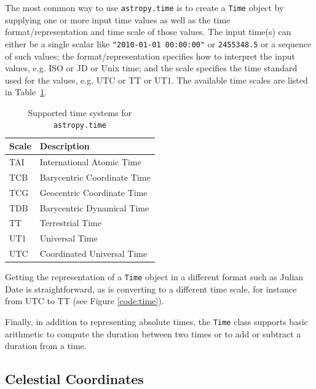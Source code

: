 \documentclass[traditabstract]{aa}
\begin{document}
The most common way to use \texttt{astropy.time} is to create a \texttt{Time} object
by supplying one or more input time values as well as the time format/representation
and time scale of those values. The input time(s) can either be a
single scalar like \verb|"2010-01-01 00:00:00"| or \verb|2455348.5| or a
sequence of such values; the format/representation specifies how to interpret the input
values, e.g. ISO or JD or Unix time; and the scale specifies the time standard
used for the values, e.g. UTC or TT or UT1. The available time scales are
listed in Table~\ref{tab:time_systems}.

\begin{table}
\caption{Supported time systems for \texttt{astropy.time}\label{tab:time_systems}}
\center
\begin{tabular}{ll}
\hline
Scale  & Description \\
\hline
TAI    & International Atomic Time \\
TCB    & Barycentric Coordinate Time \\
TCG    & Geocentric Coordinate Time \\
TDB    & Barycentric Dynamical Time \\
TT     & Terrestrial Time \\
UT1    & Universal Time \\
UTC    & Coordinated Universal Time \\
\hline
\end{tabular}
\end{table}

Getting the representation of a \texttt{Time} object in a different format
such as Julian Date is straightforward, as is converting to a different time
scale, for instance from UTC to TT (see Figure \ref{code:time}).


Finally, in addition to representing absolute times, the \verb|Time| class supports
basic arithmetic to compute the duration between two times or to add or
subtract a duration from a time.


\subsection{Celestial Coordinates}
\end{document}

